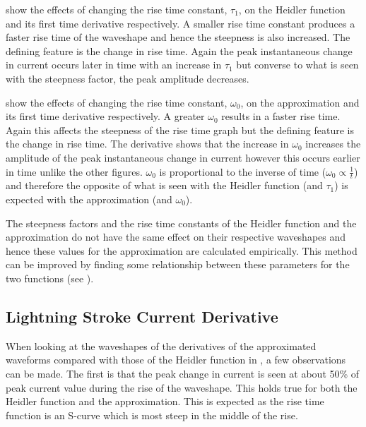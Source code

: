  show the effects of changing the rise time constant, $\tau_1$, on the Heidler function and its first time derivative respectively. A smaller rise time constant produces a faster rise time of the waveshape and hence the steepness is also increased. The defining feature is the change in rise time. Again the peak instantaneous change in current occurs later in time with an increase in $\tau_1$ but converse to what is seen with the steepness factor, the peak amplitude decreases.

 show the effects of changing the rise time constant, $\omega_0$, on the approximation and its first time derivative respectively. A greater $\omega_0$ results in a faster rise time. Again this affects the steepness of the rise time graph but the defining feature is the change in rise time. The derivative shows that the increase in $\omega_0$ increases the amplitude of the peak instantaneous change in current however this occurs earlier in time unlike the other figures. $\omega_0$ is proportional to the inverse of time ($\omega_0 \propto \frac{1}{t}$) and therefore the opposite of what is seen with the Heidler function (and $\tau_1$) is expected with the approximation (and $\omega_0$).

The steepness factors and the rise time constants of the Heidler function and the approximation do not have the same effect on their respective waveshapes and hence these values for the approximation are calculated empirically. This method can be improved by finding some relationship between these parameters for the two functions (see ).

\subsection{Lightning Stroke Current Derivative}
\label{sub:discussion_stroke_current_derivative}
When looking at the waveshapes of the derivatives of the approximated waveforms compared with those of the Heidler function in , a few observations can be made. The first is that the peak change in current is seen at about 50\% of peak current value during the rise of the waveshape. This holds true for both the Heidler function and the approximation. This is expected as the rise time function is an S-curve which is most steep in the middle of the rise.

